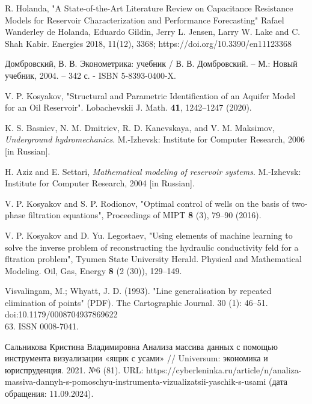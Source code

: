 \documentclass[14pt]{article}
\begin{document}
\begin{thebibliography}{20}
		
		 R. Holanda, "A State-of-the-Art Literature Review on Capacitance
		Resistance Models for Reservoir Characterization
		and Performance Forecasting" Rafael Wanderley de Holanda, Eduardo Gildin, Jerry L. Jensen, Larry W. Lake and C. Shah Kabir. Energies 2018, 11(12), 3368; https://doi.org/10.3390/en11123368
		
		 Домбровский, В. В. Эконометрика: учебник / В. В. Домбровский. – М.: Новый учебник, 2004. – 342 с. - ISBN 5-8393-0400-X.
		
		 V. P. Kosyakov, "Structural and Parametric Identification
		of an Aquifer Model for an Oil Reservoir". Lobachevskii J. Math.
		{\bf 41}, 1242--1247 (2020).
		
		 K. S. Basniev, N. M. Dmitriev, R. D. Kanevskaya, and V. M. Maksimov,
		\textit{Underground hydromechanics}. M.-Izhevsk: Institute for
		Computer Research, 2006 [in Russian].
		
		 H. Aziz and E. Settari, \textit{Mathematical modeling of reservoir systems}.
		M.-Izhevsk: Institute for Computer Research, 2004 [in Russian].
		
		 V. P. Kosyakov and S. P. Rodionov, "Optimal control of wells on the basis of two-phase filtration equations", Proceedings of MIPT {\bf 8} (3),
		79--90 (2016).
		
		 V. P. Kosyakov and  D. Yu. Legostaev, "Using elements of machine learning to solve the inverse problem of reconstructing the hydraulic 
		conductivity feld for a fltration problem", Tyumen State University
		Herald. Physical and Mathematical Modeling. Oil, Gas, Energy {\bf 8}
		(2 (30)), 129--149.
		
		  Visvalingam, M.; Whyatt, J. D. (1993). "Line generalisation by repeated elimination of points" (PDF). The Cartographic Journal. 30 (1): 46–51. doi:10.1179/0008704937869622\\
		63. ISSN 0008-7041.
		
		  Сальникова Кристина Владимировна Анализа массива данных с помощью инструмента визуализации «ящик с усами» // Universum: экономика и юриспруденция. 2021. №6 (81). URL: https://cyberleninka.ru/article/n/analiza-massiva-dannyh-s-pomoschyu-instrumenta-vizualizatsii-yaschik-s-usami (дата обращения: 11.09.2024).
		
\end{thebibliography}
	

	
\end{document}
